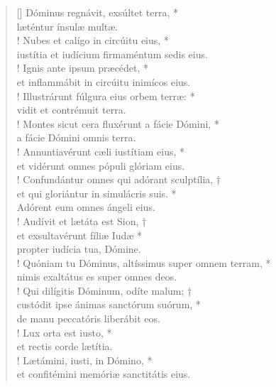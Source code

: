 \begin{verse}[\versewidth]
Dóminus regnávit, exsúltet terra, *\\
læténtur ínsulæ multæ.\\!
\vin Nubes et calígo in circúitu eius, *\\
\vin iustítia et iudícium firmaméntum sedis eius.\\!
Ignis ante ipsum præcédet, *\\
et inflammábit in circúitu inimícos eius.\\!
\vin Illustrárunt fúlgura eius orbem terræ: *\\
\vin vidit et contrémuit terra.\\!
Montes sicut cera fluxérunt a fácie Dómini, *\\
a fácie Dómini omnis terra.\\!
\vin Annuntiavérunt cæli iustítiam eius, *\\
\vin et vidérunt omnes pópuli glóriam eius.\\!
Confundántur omnes qui adórant sculptília, †\\
et qui gloriántur in simulácris suis. *\\
Adórent eum omnes ángeli eius.\\!
\vin Audívit et lætáta est Sion, †\\
\vin et exsultavérunt fíliæ Iudæ *\\
\vin propter iudícia tua, Dómine.\\!
Quóniam tu Dóminus, altíssimus super omnem terram, *\\
nimis exaltátus es super omnes deos.\\!
\vin Qui dilígitis Dóminum, odíte malum; †\\
\vin custódit ipse ánimas sanctórum suórum, *\\
\vin de manu peccatóris liberábit eos.\\!
Lux orta est iusto, *\\
et rectis corde lætítia.\\!
\vin Lætámini, iusti, in Dómino, *\\
\vin et confitémini memóriæ sanctitátis eius.\\
\end{verse}
\vspace{1cm}


